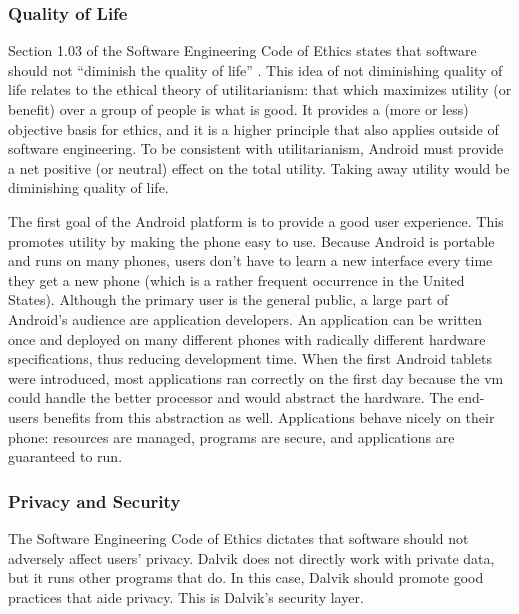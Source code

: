 \documentclass[11pt]{article}
\begin{document}
\begin{multicols}{2}

\subsubsection{Quality of Life} %
\label{ssub:quality}

Section 1.03 of the Software Engineering Code of Ethics states that software
should not ``diminish the quality of life'' \cite[\S1.03]{secode}.  This idea of
not diminishing quality of life relates to the ethical theory of utilitarianism:
that which maximizes utility (or benefit) over a group of people is what is
good. \cite[pg.~16]{utilitarianism}  It provides a (more or less) objective basis for ethics, and it is a
higher principle that also applies outside of software engineering.  To be
consistent with utilitarianism, Android must provide a net positive (or neutral)
effect on the total utility.  Taking away utility would be diminishing quality
of life.

The first goal of the Android platform is to provide a good user experience.
This promotes utility by making the phone easy to use.  Because Android is
portable and runs on many phones, users don't have to learn a new interface
every time they get a new phone (which is a rather frequent occurrence in the
United States).  Although the primary user is the general public, a large part
of Android's audience are application developers.  An application can be written
once and deployed on many different phones with radically different hardware
specifications, thus reducing development time.  When the first Android tablets
were introduced, most applications ran correctly on the first day because the
\gls{vm} could handle the better processor and would abstract the hardware.
\cite{android-tablet}  The end-users benefits from this abstraction as well.
Applications behave nicely on their phone: resources are managed, programs are
secure, and applications are guaranteed to run.


\subsubsection{Privacy and Security} %
\label{ssub:privacy}

The Software Engineering Code of Ethics dictates that software should not
adversely affect users' privacy.  Dalvik does not directly work with private
data, but it runs other programs that do.  In this case, Dalvik should promote
good practices that aide privacy.  This is Dalvik's security layer.


\end{multicols}
\end{document}
